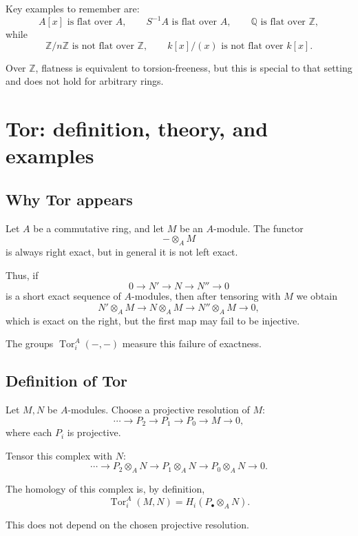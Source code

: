 \documentclass[12pt,a4paper]{article}
\theoremstyle{notespace}
\begin{document}
Key examples to remember are:
\[
A[x]\text{ is flat over }A,
\qquad
S^{-1}A\text{ is flat over }A,
\qquad
\mathbb Q\text{ is flat over }\mathbb Z,
\]
while
\[
\mathbb Z/n\mathbb Z\text{ is not flat over }\mathbb Z,
\qquad
k[x]/(x)\text{ is not flat over }k[x].
\]

Over \(\mathbb Z\), flatness is equivalent to torsion-freeness, but this is special to that setting and does not hold for arbitrary rings.

\section{Tor: definition, theory, and examples}

\subsection{Why Tor appears}

Let \(A\) be a commutative ring, and let \(M\) be an \(A\)-module. The functor
\[
-\otimes_A M
\]
is always right exact, but in general it is not left exact.

Thus, if
\[
0\longrightarrow N' \longrightarrow N \longrightarrow N'' \longrightarrow 0
\]
is a short exact sequence of \(A\)-modules, then after tensoring with \(M\) we obtain
\[
N'\otimes_A M \longrightarrow N\otimes_A M \longrightarrow N''\otimes_A M \longrightarrow 0,
\]
which is exact on the right, but the first map may fail to be injective.

The groups \(\operatorname{Tor}_i^A(-,-)\) measure this failure of exactness.

\subsection{Definition of Tor}

Let \(M,N\) be \(A\)-modules. Choose a projective resolution of \(M\):
\[
\cdots \longrightarrow P_2 \longrightarrow P_1 \longrightarrow P_0 \longrightarrow M \longrightarrow 0,
\]
where each \(P_i\) is projective.

Tensor this complex with \(N\):
\[
\cdots \longrightarrow P_2\otimes_A N \longrightarrow P_1\otimes_A N \longrightarrow P_0\otimes_A N \longrightarrow 0.
\]

The homology of this complex is, by definition,
\[
\operatorname{Tor}_i^A(M,N)=H_i(P_\bullet\otimes_A N).
\]

This does not depend on the chosen projective resolution.
\end{document}
